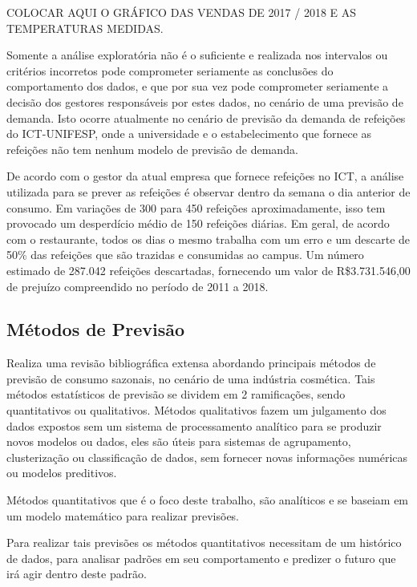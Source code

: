 \documentclass[	12pt, Times, openright, twoside, a4paper, english, brazil]{abntex2}
\begin{document}
COLOCAR AQUI O GRÁFICO DAS VENDAS DE 2017 / 2018 E AS TEMPERATURAS MEDIDAS.

Somente a análise exploratória não é o suficiente e realizada nos intervalos ou critérios incorretos pode comprometer seriamente as conclusões do comportamento dos dados, e que por sua vez pode comprometer seriamente a decisão dos gestores responsáveis por estes dados, no cenário de uma previsão de demanda. 
Isto ocorre atualmente no cenário de previsão da demanda de refeições do ICT-UNIFESP, onde a universidade e o estabelecimento que fornece as refeições não tem nenhum modelo de previsão de demanda. 

De acordo com o gestor da atual empresa que fornece refeições no ICT, a análise utilizada para se prever as refeições é observar dentro da semana o dia anterior de consumo. Em variações de 300 para 450 refeições aproximadamente, isso tem provocado um desperdício médio de 150 refeições diárias. Em geral, de acordo com o restaurante, todos os dias o mesmo trabalha com um erro e um descarte de 50\% das refeições que são trazidas e consumidas ao campus. Um número estimado de 287.042 refeições descartadas, fornecendo um valor de R\$3.731.546,00 de prejuízo compreendido no período de 2011 a 2018.

\subsection{Métodos de Previsão} 

\cite{Junior2007} Realiza uma revisão bibliográfica extensa abordando principais métodos de previsão de consumo sazonais, no cenário de uma indústria cosmética. Tais métodos estatísticos de previsão se dividem em 2 ramificações, sendo quantitativos ou qualitativos.
Métodos qualitativos fazem um julgamento dos dados expostos sem um sistema de processamento analítico para se produzir novos modelos ou dados, eles são úteis para sistemas de agrupamento, clusterização ou classificação de dados, sem fornecer novas informações numéricas ou modelos preditivos.

Métodos quantitativos que é o foco deste trabalho, são analíticos e se baseiam em um modelo matemático para realizar previsões. 

Para realizar tais previsões os métodos quantitativos necessitam de um histórico de dados, para analisar padrões em seu comportamento e predizer o futuro que irá agir dentro deste padrão.
\end{document}
